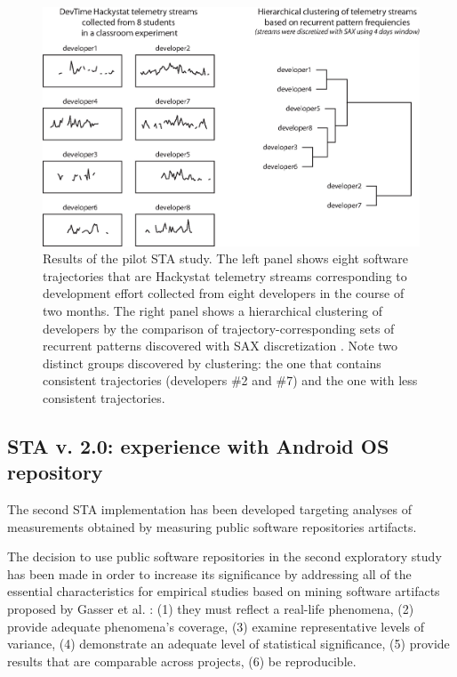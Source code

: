 \begin{figure}[t]
   \centering
   \includegraphics[width=145mm]{figures/STA1.eps}
   \caption{Results of the pilot STA study. 
   The left panel shows eight software trajectories that are Hackystat telemetry streams 
   corresponding to development effort \cite{citeulike:557296} collected from eight developers in the course of two months.
   The right panel shows a hierarchical clustering of developers by the comparison of trajectory-corresponding sets of 
   recurrent patterns discovered with SAX discretization \cite{sax}. 
   Note two distinct groups discovered by clustering: the one that contains consistent trajectories (developers \#2 and \#7) 
   and the one with less consistent trajectories.}
   \label{fig:STA1-results}
\end{figure}


\subsection{STA v. 2.0: experience with Android OS repository}
The second STA implementation has been developed targeting analyses of measurements obtained by measuring 
public software repositories artifacts.

The decision to use public software repositories in the second exploratory study has been made in order to increase its 
significance by addressing all of the essential characteristics for empirical studies based on mining software artifacts 
proposed by Gasser et al. \cite{citeulike:13058334}:  
(1) they must reflect a real-life phenomena, 
(2) provide adequate phenomena's coverage, 
(3) examine representative levels of variance, 
(4) demonstrate an adequate level of statistical significance,
(5) provide results that are comparable across projects,
(6) be reproducible. 

